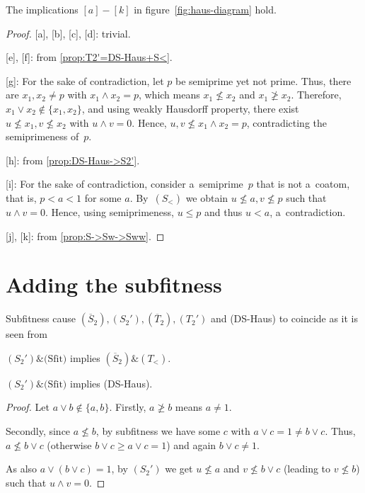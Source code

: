 \begin{prop}
  The implications $[a]-[k]$ in figure~\ref{fig:haus-diagram} hold.
\end{prop}
\begin{proof}

  [a], [b], [c], [d]:
  trivial.

  [e], [f]:
  from \ref{prop:T2'=DS-Haus+S<}.

  [g]:
  For the sake of contradiction, let $p$ be semiprime yet not prime.
  Thus, there are $x_1, x_2 \ne p$ with $x_1 \wedge x_2 = p$, which means
  $x_1\not\le x_2$ and $x_1\not\ge x_2$.
  Therefore, $x_1 \vee x_2 \not\in \{ x_1, x_2 \}$, and using weakly Hausdorff
  property, there exist $u\not\le x_1, v\not\le x_2$ with $u \wedge v = 0$.
  Hence, $u, v\not\le x_1 \wedge x_2 = p$, contradicting the semiprimeness
  of~$p$.

  [h]:
  from \ref{prop:DS-Haus->S2'}.

  [i]:
  For the sake of contradiction, consider a~semiprime~$p$ that is not a~coatom,
  that is, $p < a < 1$ for some $a$.
  By~$(S_<)$ we obtain $u\not\le a, v\not\le p$ such that $u \wedge v = 0$.
  Hence, using semiprimeness, $u \le p$ and thus $u < a$, a~contradiction.

  [j], [k]:
  from \ref{prop:S->Sw->Sww}.
\end{proof}

\section{Adding the subfitness}

Subfitness cause $(\overline{S}_2), (S_2'), (\overline{T}_2), (T_2')$ and
(DS-Haus) to coincide as it is seen from

\begin{thm}
  $(S_2')\&\text{(Sfit)}$ implies $(\overline{S}_2)\&(T_<)$.
\end{thm}

\begin{lem}
  $(S_2')\&\text{(Sfit)}$ implies (DS-Haus).
\end{lem}
\begin{proof}
  Let $a \vee b\not\in \{ a, b \}$.
  Firstly, $a\not\ge b$ means $a \ne 1$.

  Secondly, since $a\not\le b$, by subfitness we have some $c$ with $a \vee c =
  1 \ne b \vee c$.
  Thus, $a\not\le b \vee c$ (otherwise $b \vee c \ge a \vee c = 1$) and again
  $b \vee c \ne 1$.

  As also $a \vee (b \vee c) = 1$, by $(S_2')$ we get $u\not\le a$ and
  $v\not\le b \vee c$ (leading to $v\not\le b$) such that $u \wedge v = 0$.
\end{proof}

